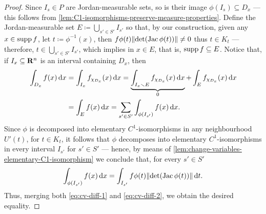 \begin{proof}
    Since \(I_s \in P\) are Jordan-measurable sets, so is their image \(\phi(I_s)
    \subseteq D_x\) --- this follows from
    \cref{lem:C1-isomorphisms-preserve-measure-properties}. Define the
    Jordan-measurable set \(E \coloneq \bigcup_{s' \in S'} I_{s'}\) so that, by our
    construction, given any \(x \in \operatorname{supp} f\), let \(t \coloneq \phi^{-1}(x)\), then
    \(f\phi(t) \lVert\det(\operatorname{Jac} \phi(t))\rVert \neq 0\) thus \(t \in K_t\) --- therefore,
    \(t \in \bigcup_{s' \in S'} I_{s'}\), which implies in \(x \in E\), that is,
    \(\operatorname{supp} f \subseteq E\). Notice that, if \(I_x \subseteq \mathbf{R}^n\) is an interval
    containing \(D_x\), then
    \begin{align}
        \nonumber
        \int_{D_x} f(x)\, \mathrm{d} x
         & = \int_{I_x} f_{\chi_{D_x}}(x)\, \mathrm{d} x
        = \underbrace{\int_{I_x \smallsetminus E} f_{\chi_{D_x}}(x)\, \mathrm{d} x}_0
        + \int_E f_{\chi_{D_x}}(x)\, \mathrm{d} x        \\
        \label{eq:cv-diff-1}
         & = \int_E f(x)\, \mathrm{d} x
        = \sum_{s' \in S'} \int_{\phi(I_{s'})} f(x)\, \mathrm{d} x.
    \end{align}
    Since \(\phi\) is decomposed into elementary \(C^1\)-isomorphisms in
    any neighbourhood \(U'(t)\), for \(t \in K_t\), it follows that \(\phi\)
    decomposes into elementary \(C^1\)-isomorphisms in every interval \(I_{s'}\) for
    \(s' \in S'\) --- hence, by means of
    \cref{lem:change-variables-elementary-C1-isomorphism} we conclude that, for
    every \(s' \in S'\)
    \begin{equation}
        \label{eq:cv-diff-2}
        \int_{\phi(I_{s'})} f(x)\, \mathrm{d} x = \int_{I_{s'}} f\phi(t) \lVert\det(\operatorname{Jac}
            \phi(t))\rVert\, \mathrm{d} t.
    \end{equation}
    Thus, merging both \cref{eq:cv-diff-1} and \cref{eq:cv-diff-2}, we obtain the
    desired equality.
\end{proof}


